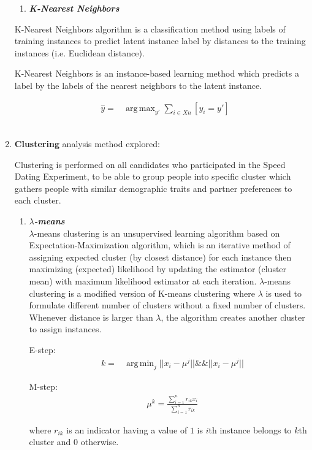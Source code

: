\documentclass[11pt,letterpaper]{article}
\DeclareMathOperator*{\argmin}{arg\,min}
\DeclareMathOperator*{\argmax}{arg\,max}
\begin{document}
\begin{enumerate}
\begin{enumerate}
\item \textbf{\emph{K-Nearest Neighbors}}
\end{enumerate}
K-Nearest Neighbors algorithm is a classification method using labels of training instances to predict latent instance label by distances to the training instances (i.e. Euclidean distance).

K-Nearest Neighbors is an instance-based learning method which predicts a label by the labels of the nearest neighbors to the latent instance. 

\begin{align}
&\hat{y} = &\argmax_{y'} \sum_{i \in Xn} [y_i = y']
\end{align}
\\


\item \textbf{Clustering} analysis method explored:

Clustering is performed on all candidates who participated in the Speed Dating Experiment, to be able to group people into specific cluster which gathers people with similar demographic traits and partner preferences to each cluster. 

\begin{enumerate}
\item \textbf{\emph{$\lambda$-means}}\\
$\lambda$-means clustering is an unsupervised learning algorithm based on Expectation-Maximization algorithm, which is an iterative method of assigning expected cluster (by closest distance) for each instance then maximizing (expected) likelihood by updating the estimator (cluster mean) with maximum likelihood estimator at each iteration. $\lambda$-means clustering is a modified version of K-means clustering where $\lambda$ is used to formulate different number of clusters without a fixed number of clusters. Whenever distance is larger than $\lambda$, the algorithm creates another cluster to assign instances.

E-step:
\begin{align}
&k = &\argmin_{j} ||x_i - \mu^j|| \&\& ||x_i - \mu^j|| 
\end{align}

M-step:
\begin{align}
&\mu^k = \frac{\sum_{i=1}^n r_{ik} x_i}{\sum_{i=1}^n r_{ik}}
\end{align}

where $r_{ik}$ is an indicator having a value of $1$ is $i$th instance belongs to $k$th cluster and $0$ otherwise.
\end{enumerate}
\end{enumerate}
\end{document}
